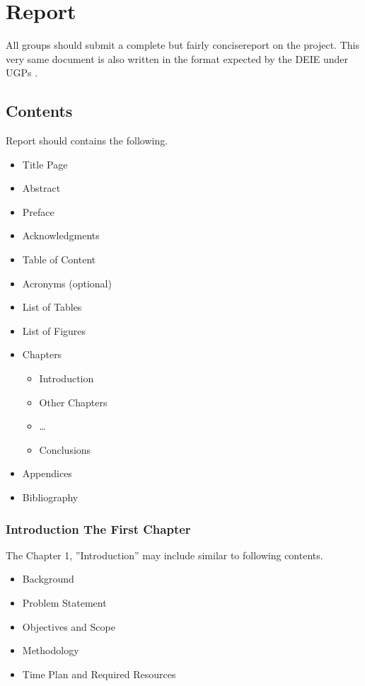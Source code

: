 ﻿\chapter{Report}\label{cha:report}

All groups should submit a complete but fairly concisereport on the project. This very same document is also written in the format expected by the DEIE under UGPs \cite{Abdelhakim2015}.

\section{Contents}\label{sec:reportcontetns}

Report should contains the following.
\begin{itemize}
	\item Title Page
	\item Abstract
	\item Preface
	\item Acknowledgments
	\item Table of Content
	\item Acronyms (optional)
	\item List of Tables
	\item List of Figures
	\item Chapters
		\begin{itemize}
			\item Introduction
			\item Other Chapters
			\item \ldots
			\item Conclusions
		\end{itemize}
	\item Appendices
	\item Bibliography
\end{itemize}

\subsection{Introduction  The First Chapter}
The Chapter 1, ''Introduction''  may include similar to following contents.
\begin{itemize}
	\item Background
	\item Problem Statement
	\item Objectives and Scope
	\item Methodology
	\item Time Plan and Required Resources
\end{itemize}


